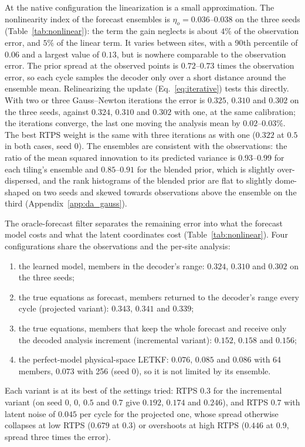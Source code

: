 At the native configuration the linearization is a small approximation.
The nonlinearity index of the forecast ensembles is $\eta_o=0.036$--$0.038$ on
the three seeds (Table~\ref{tab:nonlinear}): the term the gain neglects is
about $4\%$ of the observation error, and $5\%$ of the linear term. It varies
between sites, with a 90th percentile of $0.06$ and a largest value of
$0.13$, but is nowhere comparable to the observation error. The prior
spread at the observed points is $0.72$--$0.73$ times the observation
error, so each cycle samples the decoder only over a short distance around
the ensemble mean. Relinearizing the update (Eq.~\eqref{eq:iterative})
tests this directly. With two or three Gauss--Newton iterations the error
is $0.325$, $0.310$ and $0.302$ on the three seeds, against $0.324$, $0.310$
and $0.302$ with one, at the same calibration; the iterations converge,
the last one moving the analysis mean by $0.02$--$0.03\%$. The best RTPS weight is
the same with three iterations as with one ($0.322$ at $0.5$ in both cases,
seed 0). The ensembles are consistent with the observations: the ratio of
the mean squared innovation to its predicted variance is $0.93$--$0.99$ for
each tiling's ensemble and $0.85$--$0.91$ for the blended prior, which is
slightly over-dispersed, and the rank histograms of the blended prior are
flat to slightly dome-shaped on two seeds and skewed towards observations
above the ensemble on the third (Appendix~\ref{app:da_gauss}).

The oracle-forecast filter separates the remaining error into what the
forecast model costs and what the latent coordinates cost
(Table~\ref{tab:nonlinear}). Four configurations share the observations
and the per-site analysis:
\begin{enumerate}
\item the learned model, members in the decoder's range: $0.324$, $0.310$ and
  $0.302$ on the three seeds;
\item the true equations as forecast, members returned to the decoder's
  range every cycle (projected variant): $0.343$, $0.341$ and $0.339$;
\item the true equations, members that keep the whole forecast and receive
  only the decoded analysis increment (incremental variant): $0.152$,
  $0.158$ and $0.156$;
\item the perfect-model physical-space LETKF: $0.076$, $0.085$ and $0.086$
  with 64 members, $0.073$ with 256 (seed 0), so it is not limited by its
  ensemble.
\end{enumerate}
Each variant is at its best of the settings tried: RTPS $0.3$ for the
incremental variant (on seed 0, $0$, $0.5$ and $0.7$ give $0.192$, $0.174$ and
$0.246$), and RTPS $0.7$ with latent noise of $0.045$ per cycle for the
projected one, whose spread otherwise collapses at low RTPS
($0.679$ at $0.3$) or overshoots at high RTPS ($0.446$ at $0.9$, spread three
times the error).

